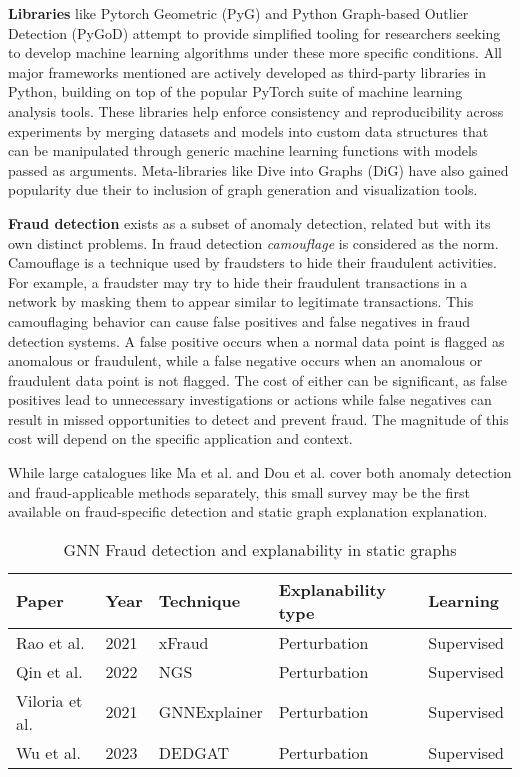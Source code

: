\textbf{Libraries} like Pytorch Geometric (PyG)\cite{pyg_team_pyg_nodate} and Python Graph-based Outlier Detection (PyGoD)\cite{liu_pygod-teampygod_2023} attempt to provide simplified tooling for researchers seeking to develop machine learning algorithms under these more specific conditions. All major frameworks mentioned are actively developed as third-party libraries in Python, building on top of the popular PyTorch\cite{chintala_pytorchpytorch_nodate} suite of machine learning analysis tools. These libraries help enforce consistency and reproducibility across experiments by merging datasets and models into custom data structures that can be manipulated through generic machine learning functions with models passed as arguments. Meta-libraries like Dive into Graphs (DiG)\cite{dive_lab_dig_nodate} have also gained popularity due their to inclusion of graph generation and visualization tools.

\textbf{Fraud detection} exists as a subset of anomaly detection, related but with its own distinct problems. In fraud detection \textit{camouflage} is considered as the norm\cite{liu_contrast_2019}. Camouflage is a technique used by fraudsters to hide their fraudulent activities. For example, a fraudster may try to hide their fraudulent transactions in a network by masking them to appear similar to legitimate transactions. This camouflaging behavior can cause false positives and false negatives in fraud detection systems. A false positive occurs when a normal data point is flagged as anomalous or fraudulent, while a false negative occurs when an anomalous or fraudulent data point is not flagged. The cost of either can be significant, as false positives lead to unnecessary investigations or actions while false negatives can result in missed opportunities to detect and prevent fraud. The magnitude of this cost will depend on the specific application and context.

While large catalogues like Ma et al.\cite{ma_comprehensive_2021} and Dou et al.\cite{dou_safe-graphdgfraud_2023} cover both anomaly detection and fraud-applicable methods separately, this small survey may be the first available on fraud-specific detection and static graph explanation explanation.

\begin{table}
    \caption{GNN Fraud detection and explanability in static graphs}
    \label{table-1}
    \centering
    \begin{tabular}{|l|l|l|l|l|}
        \hline Paper &  Year & Technique & Explanability type & Learning \\ \hline
        Rao et al.\cite{rao_xfraud_2021} & 2021 & xFraud & Perturbation & Supervised\\
        Qin et al.\cite{qin_explainable_2022} & 2022 & NGS & Perturbation & Supervised\\
        Viloria et al.\cite{acevedo-viloria_relational_2021} & 2021 & GNNExplainer & Perturbation& Supervised\\
         Wu et al.\cite{wu_dedgat_2023}& 2023 & DEDGAT & Perturbation& Supervised\\
        \hline
    \end{tabular}
\end{table}

